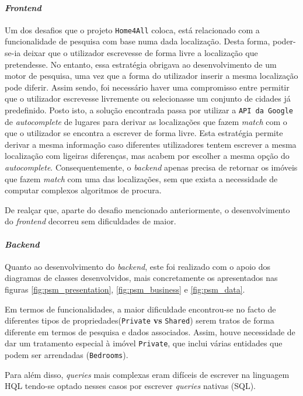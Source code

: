 \paragraph{\textit{Frontend}}

Um dos desafios que o projeto \texttt{Home4All} coloca, está relacionado com a funcionalidade de pesquisa com base numa dada localização. Desta forma, poder-se-ia deixar que o utilizador escrevesse de forma livre a localização que pretendesse. No entanto, essa estratégia obrigava ao desenvolvimento de um motor de pesquisa, uma vez que a forma do utilizador inserir a mesma localização pode diferir. Assim sendo, foi necessário haver uma compromisso entre permitir que o utilizador escrevesse livremente ou selecionasse um conjunto de cidades já predefinido. Posto isto, a solução encontrada passa por utilizar a \texttt{API da Google} de \textit{autocomplete} de lugares para derivar as localizações que fazem \textit{match} com o que o utilizador se encontra a escrever de forma livre. Esta estratégia permite derivar a mesma informação caso diferentes utilizadores tentem escrever a mesma localização com ligeiras diferenças, mas acabem por escolher a mesma opção do \textit{autocomplete}. Consequentemente, o \textit{backend} apenas precisa de retornar os imóveis que fazem \textit{match} com uma das localizações, sem que exista a necessidade de computar complexos algoritmos de procura.

De realçar que, aparte do desafio mencionado anteriormente, o desenvolvimento do \textit{frontend} decorreu sem dificuldades de maior.

\paragraph{\textit{Backend}}
Quanto ao desenvolvimento do \textit{backend}, este foi realizado com o apoio dos diagramas de classes desenvolvidos, mais concretamente os apresentados nas figuras \ref{fig:psm_presentation}, \ref{fig:psm_business} e \ref{fig:psm_data}. 

Em termos de funcionalidades, a maior dificuldade encontrou-se no facto de diferentes tipos de propriedades(\texttt{Private} \textbf{vs} \texttt{Shared}) serem tratos de forma diferente em termos de pesquisa e dados associados. Assim, houve necessidade de dar um tratamento especial à imóvel \texttt{Private}, que inclui várias entidades que podem ser arrendadas (\texttt{Bedrooms}).

Para além disso, \textit{queries} mais complexas eram difíceis de escrever na linguagem HQL tendo-se optado nesses casos por escrever \textit{queries} nativas (SQL).

